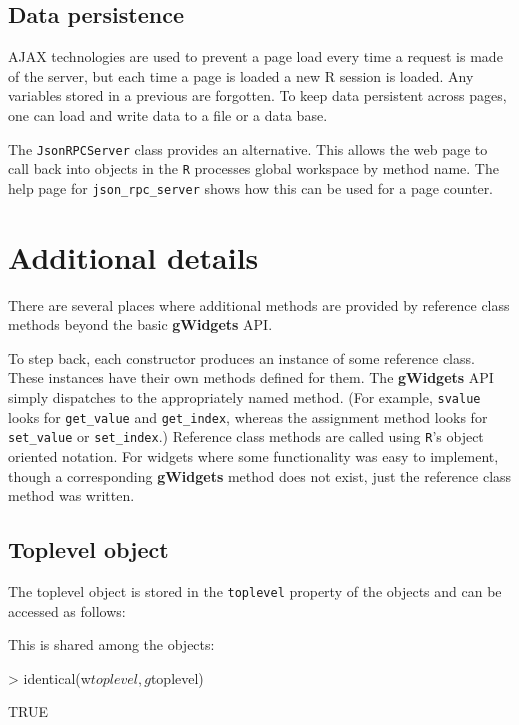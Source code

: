 \documentclass[12pt]{article}
\newcommand{\pkg}[1]{\textbf{#1}}
\newcommand{\code}[1]{\texttt{#1}}
\newcommand{\proglang}[1]{\code{#1}}
\newcommand{\R}{\proglang{R}}
\begin{document}
\subsection{Data persistence}
\label{sec:data-persistence}

AJAX technologies are used to prevent a page load every time a request
is made of the server, but each time a page is loaded a new R session
is loaded. Any variables stored in a previous are forgotten. To keep
data persistent across pages, one can load and write data to a file or
a data base.

The \code{JsonRPCServer} class provides an alternative. This allows
the web page to call back into objects in the \R\/ processes global
workspace by method name. The help page for \code{json\_rpc\_server}
shows how this can be used for a page counter.



\section{Additional details}
\label{sec:additional-details}


There are several places where additional methods are provided by
reference class methods beyond the basic \pkg{gWidgets} API.

To step back, each constructor produces an instance of some reference
class. These instances have their own methods defined for them. The
\pkg{gWidgets} API simply dispatches to the appropriately named
method. (For example, \code{svalue} looks for \code{get\_value} and
\code{get\_index}, whereas
the assignment method looks for \code{set\_value} or
\code{set\_index}.) Reference class methods are called using \R's
object oriented notation. For widgets where some functionality was
easy to implement, though a corresponding \pkg{gWidgets} method does
not exist, just the reference class method was written.


\subsection{Toplevel object}
\label{sec:toplevel-object}


The toplevel object is stored in the \code{toplevel} property of the
objects and can be accessed as follows:
\begin{Schunk}
\end{Schunk}
This is shared among the objects:
\begin{Schunk}
\begin{Sinput}
> identical(w$toplevel, g$toplevel)
\end{Sinput}
\begin{Soutput}
[1] TRUE
\end{Soutput}
\end{Schunk}
\end{document}
